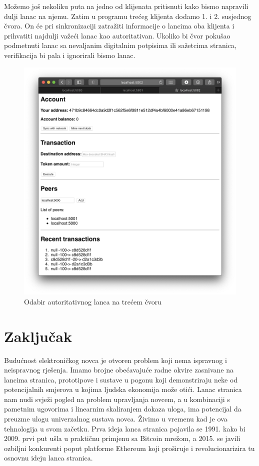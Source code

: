 \documentclass[utf8, zavrsni]{fer}
\begin{document}
Možemo još nekoliku puta na jedno od klijenata pritisnuti  kako bismo napravili dulji lanac na njemu. Zatim u programu trećeg klijenta dodamo 1. i 2. susjednog čvora. On će pri sinkronizaciji zatražiti informacije o lancima oba klijenta i prihvatiti najdulji važeći lanac kao autoritativan. Ukoliko bi čvor pokušao podmetnuti lanac sa nevaljanim digitalnim potpisima ili sažetcima stranica, verifikacija bi pala i ignorirali bismo lanac.

\begin{figure}[H]
    \centering
    \includegraphics[width=\textwidth]{autoritativni_najdulji_lanac.png}
    \caption{Odabir autoritativnog lanca na trećem čvoru}
    \label{fig:autoritativni}
\end{figure}

\chapter{Zaključak}
Budućnost elektroničkog novca je otvoren problem koji nema ispravnog i neispravnog rješenja. Imamo brojne obećavajuće radne okvire zasnivane na lancima stranica, prototipove i sustave u pogonu koji demonstriraju neke od potencijalnih smjerova u kojima ljudska ekonomija može otići. Lanac stranica nam nudi svježi pogled na problem upravljanja novcem, a u kombinaciji s pametnim ugovorima i linearnim skaliranjem dokaza uloga, ima potencijal da preuzme ulogu univerzalnog sustava novca. Živimo u vremenu kad je ova tehnologija u svom začetku. Prva ideja lanca stranica pojavila se 1991. kako bi 2009. prvi put ušla u praktičnu primjenu sa Bitcoin mrežom, a 2015. se javili ozbiljni konkurenti poput platforme Ethereum koji proširuje i revolucionarizira tu osnovnu ideju lanca stranica.
\end{document}

